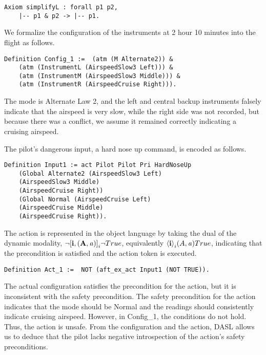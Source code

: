 \begin{tcolorbox}
	\begin{lstlisting}[language=Coq]
	Axiom simplifyL : forall p1 p2,
	|-- p1 & p2 -> |-- p1.
	\end{lstlisting}
\end{tcolorbox}
We formalize the configuration of the instruments at 2 hour 10 minutes into the flight as follows.
\begin{tcolorbox}\begin{lstlisting}[language=Coq]
	Definition Config_1 :=  (atm (M Alternate2)) & 
	(atm (InstrumentL (AirspeedSlow3 Left))) & 
	(atm (InstrumentM (AirspeedSlow3 Middle))) & 
	(atm (InstrumentR (AirspeedCruise Right))).
	\end{lstlisting}\end{tcolorbox}
The mode is Alternate Law 2, and the left and central backup instruments falsely indicate that the airspeed is very slow, while the right side was not recorded, but because there was a conflict, we assume it remained correctly indicating a cruising airspeed.

The pilot's dangerous input, a hard nose up command, is encoded as follows.
\begin{tcolorbox}\begin{lstlisting}[language=Coq]
	Definition Input1 := act Pilot Pilot Pri HardNoseUp 
	(Global Alternate2 (AirspeedSlow3 Left) 
	(AirspeedSlow3 Middle) 
	(AirspeedCruise Right))
	(Global Normal (AirspeedCruise Left) 
	(AirspeedCruise Middle) 
	(AirspeedCruise Right)).
	\end{lstlisting}\end{tcolorbox}
The action is represented in the object language by taking the dual of the dynamic modality, ${\neg} \mathbf{[i,(A,\mathit{a})]}_i{\neg} True$, equivalently $\mathbf{\langle i\rangle}_i{(A,\mathit{a})}True$, indicating that the precondition is satisfied and the action token is executed.
\begin{tcolorbox}\begin{lstlisting}[language=Coq]
	Definition Act_1 :=  NOT (aft_ex_act Input1 (NOT TRUE)).
	\end{lstlisting}
\end{tcolorbox}
The actual configuration satisfies the precondition for the action, but it is inconsistent with the safety precondition. The safety precondition for the action indicates that the mode should be Normal and the readings should consistently indicate cruising airspeed. However, in Config\_1, the conditions do not hold. Thus, the action is unsafe. From the configuration and the action, DASL allows us to deduce that the pilot lacks negative introspection of the action's safety preconditions.

